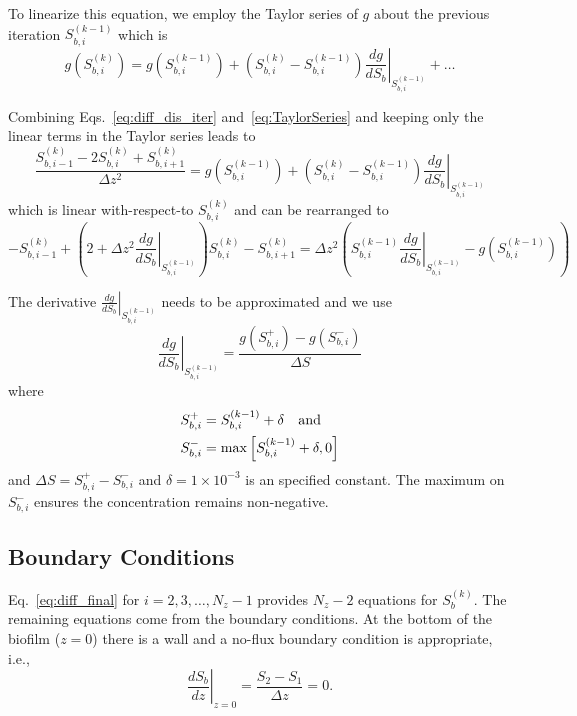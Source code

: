 \documentclass[letterpaper, twoside]{article}
\numberwithin{equation}{section}
\newcommand{\ie}{i.e.}
\begin{document}
To linearize this equation, we employ the Taylor series of $g$ about the previous iteration $S_{b,i}^{(k-1)}$ which is
\begin{equation}\label{eq:TaylorSeries}
  g\left(S_{b,i}^{(k)}\right) =   g\left(S_{b,i}^{(k-1)}\right) + \left( S_{b,i}^{(k)} - S_{b,i}^{(k-1)}\right) \left.\frac{d g}{d S_b}\right|_{S_{b,i}^{(k-1)}} + \dots
\end{equation}

Combining Eqs.~\ref{eq:diff_dis_iter} and~\ref{eq:TaylorSeries} and keeping only the linear terms in the Taylor series leads to
\begin{equation} \label{eq:diff_linear}
  \frac{ S_{b,i-1}^{(k)} - 2 S_{b,i}^{(k)} + S_{b,i+1}^{(k)}}{\Delta z^2} =  g\left(S_{b,i}^{(k-1)}\right) + \left( S_{b,i}^{(k)} - S_{b,i}^{(k-1)}\right) \left.\frac{d g}{d S_b}\right|_{S_{b,i}^{(k-1)}} 
\end{equation}
which is linear with-respect-to $S_{b,i}^{(k)}$ and can be rearranged to
\begin{equation}
  \label{eq:diff_final}
  -S_{b,i-1}^{(k)} + \left( 2 +\Delta z^2\left.\frac{d g}{d S_b}\right|_{S_{b,i}^{(k-1)}}\right) S_{b,i}^{(k)} - S_{b,i+1}^{(k)}
  = \Delta z^2\left( S_{b,i}^{(k-1)} \left.\frac{d g}{d S_b}\right|_{S_{b,i}^{(k-1)}} - g\left(S_{b,i}^{(k-1)}\right)\right) 
\end{equation}

The derivative $\left.\frac{d g}{d S_b}\right|_{S_{b,i}^{(k-1)}}$ needs to be approximated and we use
\begin{equation}
  \label{eq:dgds}
  \left.\frac{d g}{d S_b}\right|_{S_{b,i}^{(k-1)}} = \frac{g\left(S_{b,i}^+\right) - g\left(S_{b,i}^{-}\right)}{\Delta S}
\end{equation}
where
\begin{align*}
  S_{b,i}^+&=S_{b,i}^{(k-1)}+\delta \text{\quad and} \\
  S_{b,i}^-&=\max\left[S_{b,i}^{(k-1)}+\delta,0\right]
\end{align*}
and $\Delta S = S_{b,i}^+ - S_{b,i}^-$ and $\delta=1\times 10^{-3}$ is an specified constant.  The maximum on $S_{b,i}^-$ ensures the concentration remains non-negative.

\subsection{Boundary Conditions} \label{Boundary Conditions}
Eq.~\ref{eq:diff_final} for $i=2,3,\dots,N_z-1$ provides $N_z-2$ equations for $S_{b}^{(k)}$.  The remaining equations come from the boundary conditions.  At the bottom of the biofilm ($z=0$) there is a wall and a no-flux boundary condition is appropriate, \ie,
\begin{equation}
  \label{eq:BC1}
  \left.\frac{d S_b}{dz}\right|_{z=0}= \frac{S_2 - S_1}{\Delta z} =0.
\end{equation}
\end{document}
